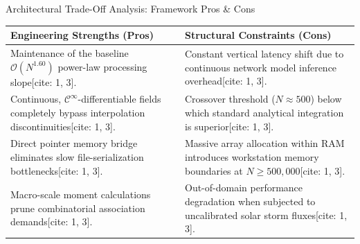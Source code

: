 \documentclass[presentation,10pt,aspectratio=169]{beamer}
\begin{document}
\begin{frame}{Architectural Trade-Off Analysis: Framework Pros \& Cons}
    \vspace*{-0.2cm}
    \begin{table}
        \small
        \centering
        \begin{tabular}{p{} p{}}
            \toprule
            \textbf{Engineering Strengths (Pros)} & \textbf{Structural Constraints (Cons)} \\
            \midrule
            Maintenance of the baseline $\mathcal{O}(N^{1.60})$ power-law processing slope[cite: 1, 3]. & Constant vertical latency shift due to continuous network model inference overhead[cite: 1, 3]. \\ \addlinespace
            Continuous, $\mathcal{C}^\infty$-differentiable fields completely bypass interpolation discontinuities[cite: 1, 3]. & Crossover threshold ($N \approx 500$) below which standard analytical integration is superior[cite: 1, 3]. \\ \addlinespace
            Direct pointer memory bridge eliminates slow file-serialization bottlenecks[cite: 1, 3]. & Massive array allocation within RAM introduces workstation memory boundaries at $N \ge 500,000$[cite: 1, 3]. \\ \addlinespace
            Macro-scale moment calculations prune combinatorial association demands[cite: 1, 3]. & Out-of-domain performance degradation when subjected to uncalibrated solar storm fluxes[cite: 1, 3]. \\
            \bottomrule
        \end{tabular}
    \end{table}
\end{frame}
\end{document}
